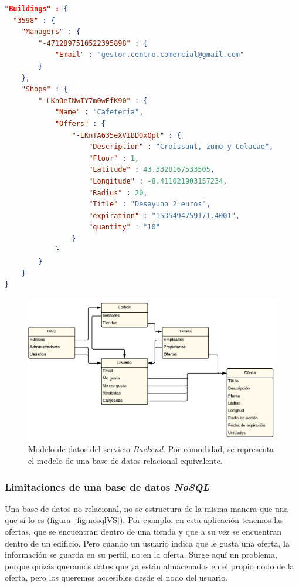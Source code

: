 \begin{lstlisting}[language=json,style=interfaces,caption=Árbol formado por una base de datos no relacional.,label={list:tree-nosql}]
"Buildings" : {
  "3598" : {
  	"Managers" : {
  		"-4712897510522395898" : {
  			"Email" : "gestor.centro.comercial@gmail.com"
		}
  	},
  	"Shops" : {
  		"-LKnOeINwIY7m0wEfK90" : {
  			"Name" : "Cafeteria",
  			"Offers" : {
  				"-LKnTA635eXVIBDOxQpt" : {
  					"Description" : "Croissant, zumo y Colacao",
  					"Floor" : 1,
  					"Latitude" : 43.3328167533505,
  					"Longitude" : -8.411021903157234,
  					"Radius" : 20,
  					"Title" : "Desayuno 2 euros",
  					"expiration" : "1535494759171.4001",
  					"quantity" : "10"
				}
  			}
  		}
  	}
}
\end{lstlisting}

\begin{figure}[tbp]
\centering
\includegraphics[scale=0.35]{figures/modelo.png}
\caption{Modelo de datos del servicio \emph{Backend}.
 Por comodidad, se representa el modelo de una base de datos relacional equivalente.\label{fig:modelo}}
\end{figure}

\subsubsection*{Limitaciones de una base de datos \textit{NoSQL}} \label{nosql}
Una base de datos no relacional, no se estructura de la misma manera que una que sí lo es (figura~\ref{fig:nosqlVS}). Por ejemplo, en esta aplicación tenemos las ofertas, que se encuentran dentro de una tienda y que a su vez se encuentran dentro de un edificio. Pero cuando un usuario indica que le gusta una oferta, la información se guarda en su perfil, no en la oferta. Surge aquí un problema, porque quizás queramos datos que ya están almacenados en el propio nodo de la oferta, pero los queremos accesibles desde el nodo del usuario.

